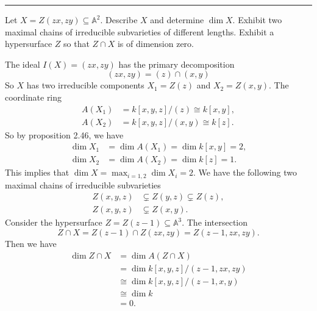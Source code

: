 \documentclass[letterpaper, 12pt]{article}
\begin{document}
\noindent\rule{7in}{2.8pt}
\begin{problem}{2.6}
Let \(X=Z(zx,zy)\subseteq \mathbb{A}^2\). Describe \(X\) and determine \(\dim X\). Exhibit two maximal chains of irreducible subvarieties of different lengths. Exhibit a hypersurface \(Z\) so that \(Z\cap X\) is of dimension zero.
\end{problem}
\begin{solution}
The ideal \(I(X)=(zx,zy)\) has the primary decomposition
\[(zx,zy)=(z)\cap (x,y)\]
So \(X\) has two irreducible components \(X_1=Z(z)\) and \(X_2=Z(x,y)\). The coordinate ring 
\begin{align*}
     A(X_1)&=k[x,y,z]/(z)\cong k[x,y],\\ 
     A(X_2)&=k[x,y,z]/(x,y)\cong k[z].
\end{align*} 
So by proposition 2.46, we have 
\begin{align*}
     \dim X_1&=\dim A(X_1)=\dim k[x,y]=2,\\ 
     \dim X_2&=\dim A(X_2)=\dim k[z]=1.
\end{align*}
This implies that \(\dim X=\max_{i=1,2} \dim X_i=2\). We have the following two maximal chains of irreducible subvarieties 
\begin{align*}
     Z(x,y,z)&\subsetneq Z(y,z)\subsetneq Z(z), \\ 
     Z(x,y,z)&\subsetneq Z(x,y).
\end{align*}
Consider the hypersurface \(Z=Z(z-1)\subseteq \mathbb{A}^3\). The intersection 
\[Z\cap X=Z(z-1)\cap Z(zx,zy)=Z(z-1,zx,zy).\]
Then we have 
\begin{align*}
     \dim Z\cap X&=\dim A(Z\cap X)\\ 
                 &=\dim k[x,y,z]/(z-1,zx,zy)\\ 
                 &\cong \dim k[x,y,z]/(z-1,x,y)\\ 
                 &\cong \dim k\\ 
                 &=0.
\end{align*}

\end{solution}
\end{document}

